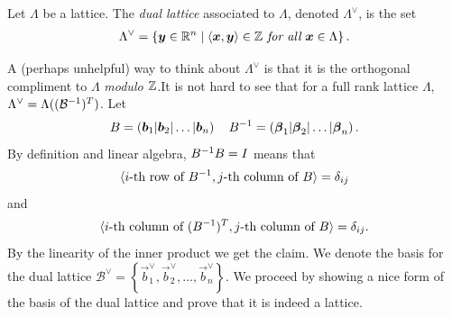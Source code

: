     \begin{definition}
        Let \(\Lambda\) be a lattice. The \emph{dual lattice} associated to \(\Lambda\), denoted \(\Lambda^\vee\), is the set 
        \begin{align*}
            \Lambda^\vee = \left\{\boldsymbol{y}\in\mathbb{R}^n\;|\;\langle \boldsymbol{x},\boldsymbol{y}\rangle\in\mathbb{Z}\emph{ for all }\boldsymbol{x}\in\Lambda\right\}.
        \end{align*}
    \end{definition}
    A (perhaps unhelpful) way to think about \(\Lambda^\vee\) is that it is the orthogonal compliment to \(\Lambda\) \emph{modulo \(\mathbb{Z}\)}.It is not hard to see that for a full rank lattice \(\Lambda\), \(\Lambda^\vee = \Lambda((\mathcal{B}^{-1})^T)\). Let
    \begin{align*}
        B = \left(\boldsymbol{b}_1 | \boldsymbol{b}_2 | \dots | \boldsymbol{b}_n\right)\quad B^{-1} = \left(\boldsymbol{\beta}_1 | \boldsymbol{\beta}_2 | \dots | \boldsymbol{\beta}_n\right).
    \end{align*}
    By definition and linear algebra, \(B^{-1} B = I\) means that 
    \begin{align*}
        \langle i\text{-th row of }B^{-1}, j\text{-th column of }B\rangle = \delta_{ij}
    \end{align*}
    and
    \begin{align*}
         \langle i\text{-th column of }(B^{-1})^T, j\text{-th column of }B\rangle = \delta_{ij}.
    \end{align*}
    By the linearity of the inner product we get the claim. We denote the basis for the dual lattice \(\mathcal{B}^\vee = \left\{\vec{b}_1^\vee,\vec{b}_2^\vee,\dots ,\vec{b}_n^\vee\right\}\). We proceed by showing a nice form of the basis of the dual lattice and prove that it is indeed a lattice.
    
